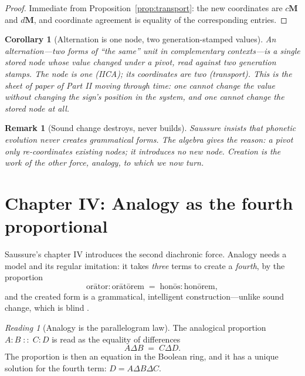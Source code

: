 \documentclass[11pt,a4paper]{article}
\newtheorem{corollary}[principle]{Corollary}
\newtheorem{remark}[principle]{Remark}
\theoremstyle{remark}
\newtheorem{reading}[principle]{Reading}
\newcommand{\xor}{\ensuremath{\Delta}}                   %
\newcommand{\Change}{\ensuremath{\mathbf{M}}}            %
\begin{document}
\begin{proof}
Immediate from Proposition~\ref{prop:transport}: the new coordinates are
$c\Change$ and $d\Change$, and coordinate agreement is equality of the
corresponding entries.
\end{proof}

\begin{corollary}[Alternation is one node, two generation-stamped values]
\label{cor:alternation}
An alternation---two forms of ``the same'' unit in complementary contexts---is
a single stored node whose value changed under a pivot, read against two
generation stamps. The node is one (IICA); its coordinates are two
(transport). This is the sheet of paper of Part II \cite{part2} moving through
time: one cannot change the value without changing the sign's position in the
system, and one cannot change the stored node at all.
\end{corollary}

\begin{remark}[Sound change destroys, never builds]
Saussure insists that phonetic evolution never creates grammatical forms. The
algebra gives the reason: a pivot only re-coordinates existing nodes; it
introduces no new node. Creation is the work of the other force, analogy,
to which we now turn.
\end{remark}

\section{Chapter IV: Analogy as the fourth proportional}
\label{sec:ch4}

Saussure's chapter IV introduces the second diachronic force. Analogy needs a
model and its regular imitation: it takes \emph{three} terms to create a
\emph{fourth}, by the proportion
\[
  \text{or{\=a}tor} : \text{or{\=a}t{\=o}rem} \;=\;
  \text{hon{\=o}s} : \text{hon{\=o}rem},
\]
and the created form is a grammatical, intelligent construction---unlike sound
change, which is blind \cite[Part III, ch.~IV]{harris1983}.

\begin{reading}[Analogy is the parallelogram law]
\label{read:analogy}
The analogical proportion $A : B \;{::}\; C : D$ is read as the equality of
differences
\[
  A \xor B \;=\; C \xor D .
\]
The proportion is then an equation in the Boolean ring, and it has a unique
solution for the fourth term: $D = A \xor B \xor C$.
\end{reading}
\end{document}
